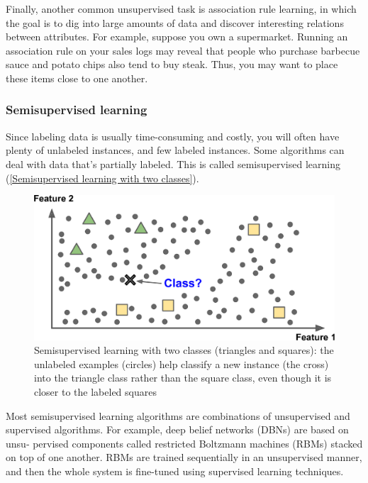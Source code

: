 Finally, another common unsupervised task is association rule learning, in which the
goal is to dig into large amounts of data and discover interesting relations between attributes. For example, suppose you own a supermarket. Running an association rule
on your sales logs may reveal that people who purchase barbecue sauce and potato
chips also tend to buy steak. Thus, you may want to place these items close to one
another.

\subsubsection{Semisupervised learning}
Since labeling data is usually time-consuming and costly, you will often have plenty of
unlabeled instances, and few labeled instances. Some algorithms can deal with data
that’s partially labeled. This is called semisupervised learning (\autoref{Semisupervised learning with two classes}).

\begin{figure}
\centering
\includegraphics{img/Semisupervised learning with two classes.png}
\caption{Semisupervised learning with two classes (triangles and squares): the unlabeled examples (circles) help classify a new instance (the cross) into the triangle class
rather than the square class, even though it is closer to the labeled squares}
\label{Semisupervised learning with two classes}
\end{figure}

Most semisupervised learning algorithms are combinations of unsupervised and
supervised algorithms. For example, deep belief networks (DBNs) are based on unsu‐
pervised components called restricted Boltzmann machines (RBMs) stacked on top of
one another. RBMs are trained sequentially in an unsupervised manner, and then the
whole system is fine-tuned using supervised learning techniques.

